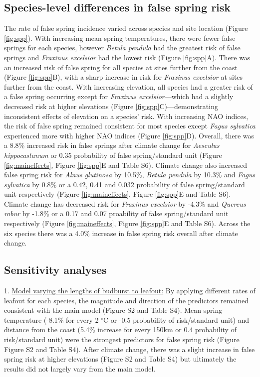 \documentclass{article}\usepackage[]{graphicx}\usepackage[]{color}
\begin{document}
\subsection*{Species-level differences in false spring risk}
The rate of false spring incidence varied across species and site location (Figure \ref{fig:spp}). With increasing mean spring temperatures, there were fewer false springs for each species, however \textit{Betula pendula} had the greatest risk of false springs and \textit{Fraxinus excelsior} had the lowest risk (Figure \ref{fig:spp}A). There was an increased risk of false spring for all species at sites further from the coast (Figure \ref{fig:spp}B), with a sharp increase in risk for \textit{Fraxinus excelsior} at sites further from the coast. With increasing elevation, all species had a greater risk of a false spring occurring except for \textit{Fraxinus excelsior}---which had a slightly decreased risk at higher elevations (Figure \ref{fig:spp}C)---demonstrating inconsistent effects of elevation on a species' risk.  With increasing NAO indices, the risk of false spring remained consistent for most species except \textit{Fagus sylvatica} experienced more with higher NAO indices (Figure \ref{fig:spp}D). Overall, there was a 8.8\% increased risk in false springs after climate change for \textit{Aesculus hippocastanum} or 0.35 probability of false spring/standard unit (Figure \ref{fig:maineffects}, Figure \ref{fig:spp}E and Table S6). Climate change also increased false spring risk for \textit{Alnus glutinosa} by 10.5\%, \textit{Betula pendula} by 10.3\% and \textit{Fagus sylvatica} by 0.8\% or a 0.42, 0.41 and 0.032 probability of false spring/standard unit respectively (Figure \ref{fig:maineffects}, Figure \ref{fig:spp}E and Table S6). Climate change has decreased risk for \textit{Fraxinus excelsior} by -4.3\% and \textit{Quercus robur} by -1.8\% or a 0.17 and 0.07 proability of false spring/standard unit respectively (Figure \ref{fig:maineffects}, Figure \ref{fig:spp}E and Table S6). Across the six species there was a 4.0\% increase in false spring risk overall after climate change.

\subsection*{Sensitivity analyses}
1. \underline{Model varying the lengths of budburst to leafout:} By applying different rates of leafout for each species, the magnitude and direction of the predictors remained consistent with the main model (Figure S2 and Table S4). Mean spring temperature (-8.1\% for every 2 $^\circ$C or -0.5 probability of risk/standard unit) and distance from the coast (5.4\% increase for every 150km or 0.4 probability of risk/standard unit) were the strongest predictors for false spring risk (Figure Figure S2 and Table S4). After climate change, there was a slight increase in false spring risk at higher elevations (Figure S2 and Table S4) but ultimately the results did not largely vary from the main model. 
\end{document}
